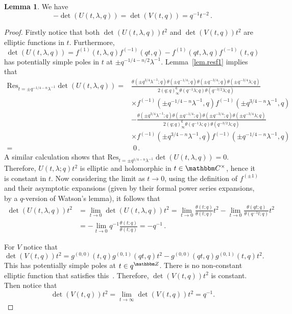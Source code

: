 \documentclass[12pt,reqno]{amsart}
\theoremstyle{definition}
\newtheorem{lemma}[theorem]{Lemma}
\def\BZ{\mathbbm Z}
\def\BC{\mathbbm C}
\def\Res{\mathrm{Res}}
\def\be{\begin{equation}}
\def\ee{\end{equation}}
\begin{document}
\begin{lemma}
\label{lem.41det}
  We have
\be
-\det(U(t,\lambda,q)) = \det(V(t,q)) = q^{-1}t^{-2} \,.
\ee
  \end{lemma}
  
\begin{proof}
Firstly notice that both $\det(U(t,\lambda,q))t^2$ and $\det(V(t,q))t^2$
are elliptic functions in $t$. Furthermore,
\be
\det(U(t,\lambda,q))
=
f^{(1)}(t,\lambda,q)f^{(-1)}(qt,q)-f^{(1)}(qt,\lambda,q)f^{(-1)}(t,q)
\ee
has potentially simple poles in $t$ at $\pm q^{-1/4-n/2}\lambda^{-1}$.
Lemma~\ref{lem.resf1} implies that
\begin{align*}
\Res_{t=\pm q^{-1/4-n}\lambda^{-1}}\det(U(t,\lambda,q)) =
&\frac{\theta(\pm q^{3/4}\lambda^{-1};q)\theta(\pm q^{-1/4};q)
  \theta(\pm q^{-3/4};q)\theta(\pm q^{-3/4}\lambda;q)}{2(q;q)_{\infty}^{6}
  \theta(q^{-1}\lambda;q)\theta(q^{-3/2}\lambda;q)} \\
& \times
f^{(-1)}(\pm q^{-1/4-n}
  \lambda^{-1},q)f^{(-1)}(\pm q^{3/4-n}\lambda^{-1},q)\\
&-\frac{\theta(\pm q^{3/4}\lambda^{-1};q)\theta(\pm q^{-1/4};q)
  \theta(\pm q^{-3/4};q)\theta(\pm q^{-3/4}\lambda;q)
}{2(q;q)_{\infty}^{6}
  \theta(q^{-1}\lambda;q)\theta(q^{-3/2}\lambda;q)}\\
& \times
f^{(-1)}(\pm q^{3/4-n}\lambda^{-1},q)f^{(-1)}(\pm q^{-1/4-n}\lambda^{-1},q) \\
  =&\; 0 \,.
\end{align*}
A similar calculation shows that
$\Res_{t=\pm q^{1/4-n}\lambda^{-1}}\det(U(t,\lambda,q))=0$.
Therefore, $U(t,\lambda;q)t^2$ is elliptic and holomorphic in
$t\in\BC^{\times}$, hence it is constant in $t$. Now considering the limit as
$t\rightarrow0$, using the definition of $f^{(\pm1)}$ and their asymptotic
expansions (given by their formal power series expansions, by a $q$-version of
Watson's lemma), it follows that
\be
\begin{aligned}
\det(U(t,\lambda,q))t^2
&=
\lim_{t\rightarrow 0}\det(U(t,\lambda,q))t^2
=
\lim_{t\rightarrow 0}\frac{\theta(t;q)}{\theta(t;q)}t^2
-\lim_{t\rightarrow 0}\frac{\theta(qt;q)}{\theta(q^{-1}t;q)}t^2\\
&=
-\lim_{t\rightarrow 0}q^{-1}\frac{\theta(t;q)}{\theta(t;q)}
=
-q^{-1} \,.
\end{aligned}
\ee

For $V$ notice that
\be
\det(V(t,q))t^{2}
=
g^{(0,0)}(t,q)g^{(0,1)}(qt,q)t^{2}-g^{(0,0)}(qt,q)g^{(0,1)}(t,q)t^{2}.
\ee
This has potentially simple poles at $t\in q^{\BZ}$. There is no non-constant
elliptic function that satisfies this~\cite{Akhiezer}.
Therefore, $\det(V(t,q))t^{2}$ is constant. Then notice that
\be
\det(V(t,q))t^{2}
=
\lim_{t\rightarrow\infty}\det(V(t,q))t^{2}
=
q^{-1}.
\ee
\end{proof}
\end{document}
